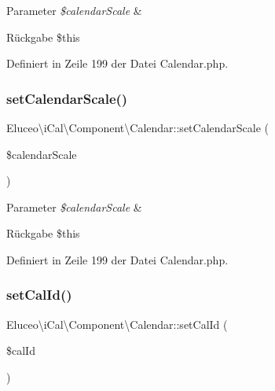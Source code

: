 \begin{DoxyParams}{Parameter}
{\em \$calendar\+Scale} & \\
\hline
\end{DoxyParams}
\begin{DoxyReturn}{Rückgabe}
\$this 
\end{DoxyReturn}


Definiert in Zeile 199 der Datei Calendar.\+php.

\mbox{\label{class_eluceo_1_1i_cal_1_1_component_1_1_calendar_a869f95eff68194dc77eb549b17516feb}} 
\subsubsection{\texorpdfstring{set\+Calendar\+Scale()}{setCalendarScale()}\hspace{0.1cm}{\footnotesize\ttfamily [3/3]}}
{\footnotesize\ttfamily Eluceo\textbackslash{}i\+Cal\textbackslash{}\+Component\textbackslash{}\+Calendar\+::set\+Calendar\+Scale (\begin{DoxyParamCaption}\item[{}]{\$calendar\+Scale }\end{DoxyParamCaption})}


\begin{DoxyParams}{Parameter}
{\em \$calendar\+Scale} & \\
\hline
\end{DoxyParams}
\begin{DoxyReturn}{Rückgabe}
\$this 
\end{DoxyReturn}


Definiert in Zeile 199 der Datei Calendar.\+php.

\mbox{\label{class_eluceo_1_1i_cal_1_1_component_1_1_calendar_a17acdac642afaf8e87e305fa44621564}} 
\subsubsection{\texorpdfstring{set\+Cal\+Id()}{setCalId()}\hspace{0.1cm}{\footnotesize\ttfamily [1/3]}}
{\footnotesize\ttfamily Eluceo\textbackslash{}i\+Cal\textbackslash{}\+Component\textbackslash{}\+Calendar\+::set\+Cal\+Id (\begin{DoxyParamCaption}\item[{}]{\$cal\+Id }\end{DoxyParamCaption})}


